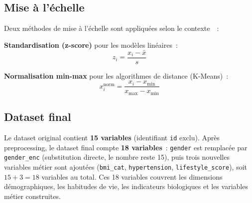 \subsection{Mise à l'échelle}

Deux méthodes de mise à l'échelle sont appliquées selon le contexte~\cite{hastie2009}~:

\textbf{Standardisation (z-score)} pour les modèles linéaires~:
\begin{equation}
z_i = \frac{x_i - \bar{x}}{s}
\end{equation}

\textbf{Normalisation min-max} pour les algorithmes de distance (K-Means)~:
\begin{equation}
x_i^{\text{norm}} = \frac{x_i - x_{\min}}{x_{\max} - x_{\min}}
\end{equation}

\subsection{Dataset final}

Le dataset original contient \textbf{15 variables} (identifiant \texttt{id} exclu). Après preprocessing, le dataset final compte \textbf{18 variables}~: \texttt{gender} est remplacée par \texttt{gender\_enc} (substitution directe, le nombre reste 15), puis trois nouvelles variables métier sont ajoutées (\texttt{bmi\_cat}, \texttt{hypertension}, \texttt{lifestyle\_score}), soit $15 + 3 = 18$ variables au total. Ces 18 variables couvrent les dimensions démographiques, les habitudes de vie, les indicateurs biologiques et les variables métier construites.
